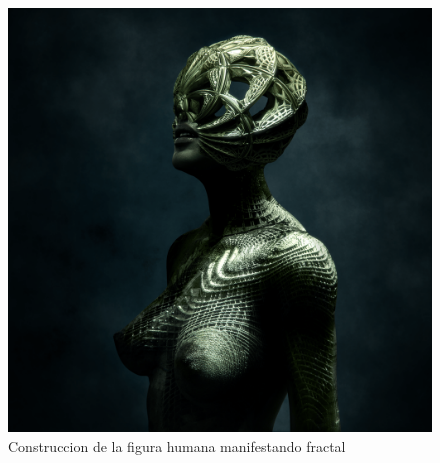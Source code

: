 \documentclass[
  11pt,
]{krantz}
\theoremstyle{definition}
\theoremstyle{definition}
\theoremstyle{definition}
\theoremstyle{definition}
\theoremstyle{remark}
\begin{document}
\begin{figure}[!ht]

{\centering \includegraphics[width=0.7\linewidth]{body1} 

}

\caption{Construccion de la figura humana manifestando fractal}\label{fig:body1}
\end{figure}
\end{document}
